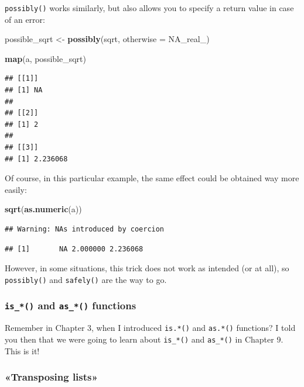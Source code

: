 \documentclass[]{gitbook}
\newenvironment{Shaded}{\begin{snugshade}}{\end{snugshade}}
\newcommand{\DataTypeTok}[1]{\textcolor[rgb]{0.13,0.29,0.53}{#1}}
\newcommand{\KeywordTok}[1]{\textcolor[rgb]{0.13,0.29,0.53}{\textbf{#1}}}
\newcommand{\NormalTok}[1]{#1}
\newcommand{\OtherTok}[1]{\textcolor[rgb]{0.56,0.35,0.01}{#1}}
\newcommand{\StringTok}[1]{\textcolor[rgb]{0.31,0.60,0.02}{#1}}
\theoremstyle{definition}
\theoremstyle{definition}
\theoremstyle{definition}
\theoremstyle{remark}
\begin{document}
\texttt{possibly()} works similarly, but also allows you to specify a
return value in case of an error:

\begin{Shaded}
\begin{Highlighting}[]
\NormalTok{possible_sqrt <-}\StringTok{ }\KeywordTok{possibly}\NormalTok{(sqrt, }\DataTypeTok{otherwise =} \OtherTok{NA_real_}\NormalTok{)}

\KeywordTok{map}\NormalTok{(a, possible_sqrt)}
\end{Highlighting}
\end{Shaded}

\begin{verbatim}
## [[1]]
## [1] NA
## 
## [[2]]
## [1] 2
## 
## [[3]]
## [1] 2.236068
\end{verbatim}

Of course, in this particular example, the same effect could be obtained
way more easily:

\begin{Shaded}
\begin{Highlighting}[]
\KeywordTok{sqrt}\NormalTok{(}\KeywordTok{as.numeric}\NormalTok{(a))}
\end{Highlighting}
\end{Shaded}

\begin{verbatim}
## Warning: NAs introduced by coercion
\end{verbatim}

\begin{verbatim}
## [1]       NA 2.000000 2.236068
\end{verbatim}

However, in some situations, this trick does not work as intended (or at
all), so \texttt{possibly()} and \texttt{safely()} are the way to go.

\hypertarget{is_-and-as_-functions}{%
\subsubsection{\texorpdfstring{\texttt{is\_*()} and \texttt{as\_*()}
functions}{is\_*() and as\_*() functions}}\label{is_-and-as_-functions}}

Remember in Chapter 3, when I introduced \texttt{is.*()} and
\texttt{as.*()} functions? I told you then that we were going to learn
about \texttt{is\_*()} and \texttt{as\_*()} in Chapter 9. This is it!

\hypertarget{transposing-lists}{%
\subsubsection{«Transposing lists»}\label{transposing-lists}}
\end{document}
